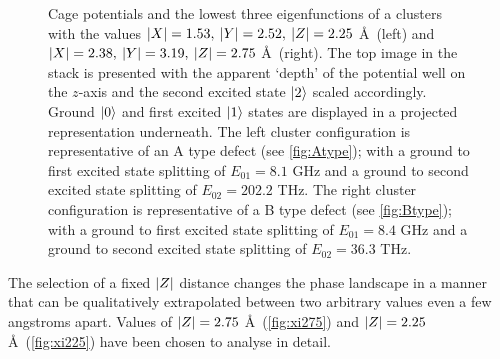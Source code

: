 \begin{figure}[htp]
\centering
\caption[fig10]{\label{fig:wfstack}Cage potentials and the lowest three eigenfunctions of a clusters with the values $\lvert X\rvert=1.53, \: \lvert Y\rvert = 2.52, \: \lvert Z\rvert = 2.25$ \AA\ (left) and $\lvert X\rvert=2.38, \: \lvert Y\rvert = 3.19, \: \lvert Z\rvert = 2.75$ \AA\ (right). The top image in the stack is presented with the apparent `depth' of the potential well on the $z$-axis and the second excited state $\lvert2\rangle$ scaled accordingly. Ground $\lvert0\rangle$ and first excited $\lvert1\rangle$ states are displayed in a projected representation underneath. The left cluster configuration is representative of an A type defect (see \cref{fig:Atype}); with a ground to first excited state splitting of $E_{01} = 8.1$ GHz and a ground to second excited state splitting of $E_{02} = 202.2$ THz. The right cluster configuration is representative of a B type defect (see \cref{fig:Btype}); with a ground to first excited state splitting of $E_{01} = 8.4$ GHz and a ground to second excited state splitting of $E_{02} = 36.3$ THz.}
\end{figure}


The selection of a fixed $\lvert Z\rvert$ distance changes the phase landscape in a manner that can be qualitatively extrapolated between two arbitrary values even a few angstroms apart.
Values of $\lvert Z\rvert = 2.75$ \AA\ (\cref{fig:xi275}) and $\lvert Z\rvert = 2.25$ \AA\ (\cref{fig:xi225}) have been chosen to analyse in detail.

